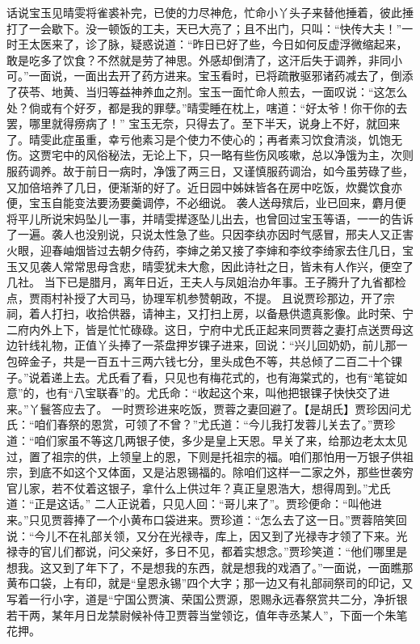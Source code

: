 \documentclass[12pt,oneside]{book}
\begin{document}
话说宝玉见晴雯将雀裘补完，已使的力尽神危，忙命小丫头子来替他捶着，彼此捶打了一会歇下。没一顿饭的工夫，天已大亮了；且不出门，只叫：“快传大夫！”一时王太医来了，诊了脉，疑惑说道：“昨日已好了些，今日如何反虚浮微缩起来，敢是吃多了饮食？不然就是劳了神思。外感却倒清了，这汗后失于调养，非同小可。”一面说，一面出去开了药方进来。宝玉看时，已将疏散驱邪诸药减去了，倒添了茯苓、地黄、当归等益神养血之剂。宝玉一面忙命人煎去，一面叹说：“这怎么处？倘或有个好歹，都是我的罪孽。”晴雯睡在枕上，嗐道：“好太爷！你干你的去罢，哪里就得痨病了！”
宝玉无奈，只得去了。至下半天，说身上不好，就回来了。晴雯此症虽重，幸亏他素习是个使力不使心的；再者素习饮食清淡，饥饱无伤。这贾宅中的风俗秘法，无论上下，只一略有些伤风咳嗽，总以净饿为主，次则服药调养。故于前日一病时，净饿了两三日，又谨慎服药调治，如今虽劳碌了些，又加倍培养了几日，便渐渐的好了。近日园中姊妹皆各在房中吃饭，炊爨饮食亦便，宝玉自能变法要汤要羹调停，不必细说。
袭人送母殡后，业已回来，麝月便将平儿所说宋妈坠儿一事，并晴雯撵逐坠儿出去，也曾回过宝玉等语，一一的告诉了一遍。袭人也没别说，只说太性急了些。只因李纨亦因时气感冒，邢夫人又正害火眼，迎春岫烟皆过去朝夕侍药，李婶之弟又接了李婶和李纹李绮家去住几日，宝玉又见袭人常常思母含悲，晴雯犹未大愈，因此诗社之日，皆未有人作兴，便空了几社。
当下已是腊月，离年日近，王夫人与凤姐治办年事。王子腾升了九省都检点，贾雨村补授了大司马，协理军机参赞朝政，不提。
且说贾珍那边，开了宗祠，着人打扫，收拾供器，请神主，又打扫上房，以备悬供遗真影像。此时荣、宁二府内外上下，皆是忙忙碌碌。这日，宁府中尤氏正起来同贾蓉之妻打点送贾母这边针线礼物，正值丫头捧了一茶盘押岁锞子进来，回说：“兴儿回奶奶，前儿那一包碎金子，共是一百五十三两六钱七分，里头成色不等，共总倾了二百二十个锞子。”说着递上去。尤氏看了看，只见也有梅花式的，也有海棠式的，也有“笔锭如意”的，也有“八宝联春”的。尤氏命：“收起这个来，叫他把银锞子快快交了进来。”丫鬟答应去了。
一时贾珍进来吃饭，贾蓉之妻回避了。【是胡氏】贾珍因问尤氏：“咱们春祭的恩赏，可领了不曾？”尤氏道：“今儿我打发蓉儿关去了。”贾珍道：“咱们家虽不等这几两银子使，多少是皇上天恩。早关了来，给那边老太太见过，置了祖宗的供，上领皇上的恩，下则是托祖宗的福。咱们那怕用一万银子供祖宗，到底不如这个又体面，又是沾恩锡福的。除咱们这样一二家之外，那些世袭穷官儿家，若不仗着这银子，拿什么上供过年？真正皇恩浩大，想得周到。”尤氏道：“正是这话。”
二人正说着，只见人回：“哥儿来了”。贾珍便命：“叫他进来。”只见贾蓉捧了一个小黄布口袋进来。贾珍道：“怎么去了这一日。”贾蓉陪笑回说：“今儿不在礼部关领，又分在光禄寺，库上，因又到了光禄寺才领了下来。光禄寺的官儿们都说，问父亲好，多日不见，都着实想念。”贾珍笑道：“他们哪里是想我。这又到了年下了，不是想我的东西，就是想我的戏酒了。”一面说，一面瞧那黄布口袋，上有印，就是“皇恩永锡”四个大字；那一边又有礼部祠祭司的印记，又写着一行小字，道是“宁国公贾演、荣国公贾源，恩赐永远春祭赏共二分，净折银若干两，某年月日龙禁尉候补侍卫贾蓉当堂领讫，值年寺丞某人”，下面一个朱笔花押。
\end{document}
